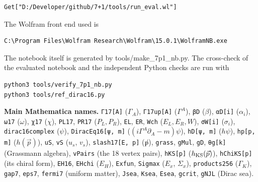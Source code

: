 \documentclass[10pt,a4paper]{article}
\begin{document}
\begin{Verbatim}[fontsize=\small,frame=single,framesep=2mm]
Get["D:/Developer/github/7+1/tools/run_eval.wl"]
\end{Verbatim}
The Wolfram front end used is

\begin{Verbatim}[fontsize=\small,frame=single,framesep=2mm]
C:\Program Files\Wolfram Research\Wolfram\15.0.1\WolframNB.exe
\end{Verbatim}
The notebook itself is generated by tools/make\_7p1\_nb.py. The cross-check of the evaluated notebook and the independent Python checks are run with

\begin{Verbatim}[fontsize=\small,frame=single,framesep=2mm]
python3 tools/verify_7p1_nb.py
python3 tools/ref_dirac16.py
\end{Verbatim}
\textbf{Main Mathematica names.} \texttt{Γ17[A]} ($\Gamma_A$), \texttt{Γ17up[A]} ($\Gamma^A$), \texttt{βD} ($\beta$), \texttt{αD[i]} ($\alpha_i$), \texttt{ω17} ($\omega$), \texttt{χ17} ($\chi$), \texttt{PL17}, \texttt{PR17} ($P_L,P_R$), \texttt{EL}, \texttt{ER}, \texttt{Wch} ($E_L,E_R,W$), \texttt{σW[i]} ($\sigma_i$), \texttt{dirac16complex} ($\psi$), \texttt{DiracEq16[ψ, m]} ($(i\Gamma^A\partial_A-m)\psi$), \texttt{hD[ψ, m]} ($h\psi$), \texttt{hp[p, m]} ($h(\vec p)$), \texttt{uS}, \texttt{vS} ($u_s$, $v_s$), \texttt{slash17[E, p]} ($\not p$), \texttt{grass}, \texttt{gMul}, \texttt{gD}, \texttt{θg[k]} (Grassmann algebra), \texttt{vPairs} (the 18 vertex pairs), \texttt{hKS[p]} ($h_{\rm KS}(\vec p)$), \texttt{hChiKS[p]} (its chiral form), \texttt{EH16}, \texttt{EHchi} ($E_H$), \texttt{Exfun}, \texttt{Sigmax} ($E_x$, $\Sigma_x$), \texttt{products256} ($\Gamma_K$), \texttt{gap7}, \texttt{eps7}, \texttt{fermi7} (uniform matter), \texttt{Jsea}, \texttt{Ksea}, \texttt{Esea}, \texttt{gcrit}, \texttt{gNJL} (Dirac sea).
\end{document}
